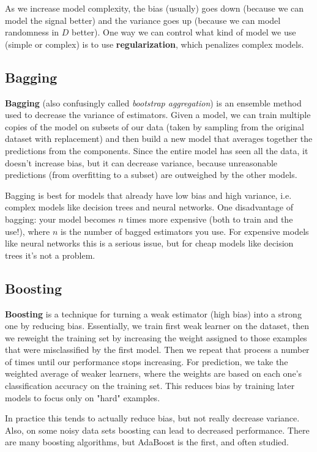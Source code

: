 \documentclass[12pt,letterpaper]{article}
\newcommand{\1}{\mathbbm{1}}
\begin{document}
\noindent 
As we increase model complexity, the bias (usually) goes down (because we can model the signal better) and the variance goes up (because we can model randomness in $D$ better). One way we can control what kind of model we use (simple or complex) is to use \textbf{regularization}, which penalizes complex models. 

\subsection{Bagging}
\textbf{Bagging} (also confusingly called \emph{bootstrap aggregation}) is an ensemble method used to decrease the variance of estimators. Given a model, we can train multiple copies of the model on subsets of our data (taken by sampling from the original dataset with replacement) and then build a new model that averages together the predictions from the components. Since the entire model has seen all the data, it doesn't increase bias, but it can decrease variance, because unreasonable predictions (from overfitting to a subset) are outweighed by the other models.

Bagging is best for models that already have low bias and high variance, i.e. complex models like decision trees and neural networks. One disadvantage of bagging: your model becomes $n$ times more expensive (both to train and the use!), where $n$ is the number of bagged estimators you use. For expensive models like neural networks this is a serious issue, but for cheap models like decision trees it's not a problem.

\subsection{Boosting}
\textbf{Boosting} is a technique for turning a weak estimator (high bias) into a strong one by reducing bias. Essentially, we train first weak learner on the dataset, then we reweight the training set by increasing the weight assigned to those examples that were misclassified by the first model. Then we repeat that process a number of times until our performance stops increasing. For prediction, we take the weighted average of weaker learners, where the weights are based on each one's classification accuracy on the training set. This reduces bias by training later models to focus only on "hard" examples.

In practice this tends to actually reduce bias, but not really decrease variance. Also, on some noisy data sets boosting can lead to decreased performance. There are many boosting algorithms, but AdaBoost is the first, and often studied. 
\end{document}
